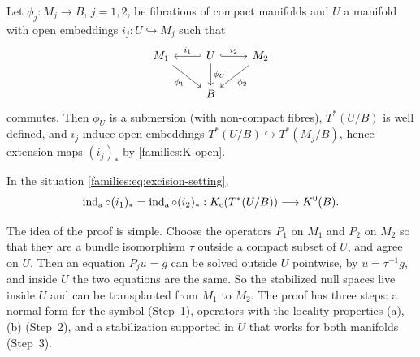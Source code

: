 Let $\phi_j:M_j\to B$, $j=1,2$, be fibrations of compact manifolds and
$U$ a manifold with open embeddings $i_j:U\hookrightarrow M_j$ such that
\begin{equation}\label{families:eq:excision-setting}
  \begin{tikzcd}
    M_1\arrow[dr,"\phi_1"']&U\arrow[l,hook',"i_1"']\arrow[r,hook,"i_2"]
    \arrow[d,"\phi_U"]&M_2\arrow[dl,"\phi_2"]\\
    &B&
  \end{tikzcd}
\end{equation}
commutes. Then $\phi_U$ is a submersion (with non-compact fibres),
$T^*(U/B)$ is well defined, and $i_j$ induce open embeddings $T^*(U/B)
\hookrightarrow T^*(M_j/B)$, hence extension maps $(i_j)_*$ by
\ref{families:K-open}.

\begin{theorem}[Excision]\label{families:thm:excision}
  In the situation \eqref{families:eq:excision-setting},
  \begin{equation*}
    \operatorname{ind}_{\mathrm{a}}\circ(i_1)_*=\operatorname{ind}_{\mathrm{a}}\circ(i_2)_*:K_{\mathrm{c}}(T^*(U/B))\longrightarrow K^0(B).
  \end{equation*}
\end{theorem}

\begin{discussion}
  The idea of the proof is simple. Choose the operators $P_1$ on $M_1$ and $P_2$
  on $M_2$ so that they are a bundle isomorphism $\tau$ outside a compact subset
  of $U$, and agree on $U$. Then an equation $P_ju=g$ can be solved outside $U$
  pointwise, by $u=\tau^{-1}g$, and inside $U$ the two equations are the same.
  So the stabilized null spaces live inside $U$ and can be transplanted from
  $M_1$ to $M_2$. The proof has three steps: a normal form for the symbol
  (Step~1), operators with the locality properties (a), (b) (Step~2), and a
  stabilization supported in $U$ that works for both manifolds (Step~3).
\end{discussion}

